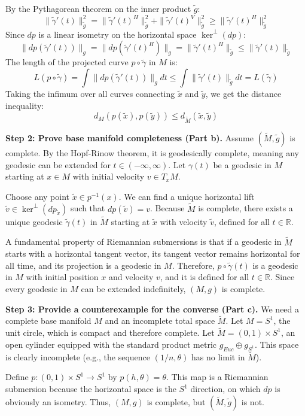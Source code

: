 \begin{solution}
By the Pythagorean theorem on the inner product $\tilde{g}$:
\[ \|\tilde{\gamma}'(t)\|_{\tilde{g}}^2 = \|\tilde{\gamma}'(t)^H\|_{\tilde{g}}^2 + \|\tilde{\gamma}'(t)^V\|_{\tilde{g}}^2 \ge \|\tilde{\gamma}'(t)^H\|_{\tilde{g}}^2 \]
Since $dp$ is a linear isometry on the horizontal space $\ker^{\perp}(dp)$:
\[ \|dp(\tilde{\gamma}'(t))\|_g = \|dp(\tilde{\gamma}'(t)^H)\|_g = \|\tilde{\gamma}'(t)^H\|_{\tilde{g}} \le \|\tilde{\gamma}'(t)\|_{\tilde{g}} \]
The length of the projected curve $p \circ \tilde{\gamma}$ in $M$ is:
\[ L(p \circ \tilde{\gamma}) = \int \|dp(\tilde{\gamma}'(t))\|_g dt \le \int \|\tilde{\gamma}'(t)\|_{\tilde{g}} dt = L(\tilde{\gamma}) \]
Taking the infimum over all curves connecting $\tilde{x}$ and $\tilde{y}$, we get the distance inequality:
\[ d_M(p(\tilde{x}), p(\tilde{y})) \le d_{\tilde{M}}(\tilde{x}, \tilde{y}) \]

\textbf{Step 2: Prove base manifold completeness (Part b).}
Assume $(\tilde{M}, \tilde{g})$ is complete. By the Hopf-Rinow theorem, it is geodesically complete, meaning any geodesic can be extended for $t \in (-\infty, \infty)$.
Let $\gamma(t)$ be a geodesic in $M$ starting at $x \in M$ with initial velocity $v \in T_x M$.

Choose any point $\tilde{x} \in p^{-1}(x)$. We can find a unique horizontal lift $\tilde{v} \in \ker^{\perp}(dp_{\tilde{x}})$ such that $dp(\tilde{v}) = v$.
Because $\tilde{M}$ is complete, there exists a unique geodesic $\tilde{\gamma}(t)$ in $\tilde{M}$ starting at $\tilde{x}$ with velocity $\tilde{v}$, defined for all $t \in \mathbb{R}$.

A fundamental property of Riemannian submersions is that if a geodesic in $\tilde{M}$ starts with a horizontal tangent vector, its tangent vector remains horizontal for all time, and its projection is a geodesic in $M$.
Therefore, $p \circ \tilde{\gamma}(t)$ is a geodesic in $M$ with initial position $x$ and velocity $v$, and it is defined for all $t \in \mathbb{R}$. Since every geodesic in $M$ can be extended indefinitely, $(M, g)$ is complete.

\textbf{Step 3: Provide a counterexample for the converse (Part c).}
We need a complete base manifold $M$ and an incomplete total space $\tilde{M}$.
Let $M = S^1$, the unit circle, which is compact and therefore complete.
Let $\tilde{M} = (0, 1) \times S^1$, an open cylinder equipped with the standard product metric $g_{Euc} \oplus g_{S^1}$. This space is clearly incomplete (e.g., the sequence $(1/n, \theta)$ has no limit in $\tilde{M}$).

Define $p: (0, 1) \times S^1 \to S^1$ by $p(h, \theta) = \theta$.
This map is a Riemannian submersion because the horizontal space is the $S^1$ direction, on which $dp$ is obviously an isometry.
Thus, $(M, g)$ is complete, but $(\tilde{M}, \tilde{g})$ is not.
\end{solution}

